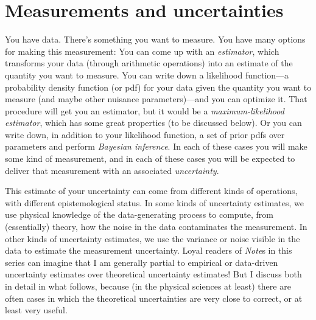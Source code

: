 \documentclass[10pt]{article}
\newcommand{\documentname}{\textsl{Note}}
\begin{document}
\section{Measurements and uncertainties}\label{sec:intro}

You have data. There's something you want to measure. You have many
options for making this measurement: You can come up with an
\textsl{estimator}, which transforms your data (through arithmetic
operations) into an estimate of the quantity you want to measure. You
can write down a likelihood function---a probability density function
(or pdf) for your data given the quantity you want to measure (and
maybe other nuisance parameters)---and you can optimize it. That
procedure will get you an estimator, but it would be a
\textsl{maximum-likelihood estimator}, which has some great
properties (to be discussed below).
Or you can write down, in addition to your likelihood
function, a set of prior pdfs over parameters and perform
\textsl{Bayesian inference}.  In each of these cases you will make
some kind of measurement, and in each of these cases you will be
expected to deliver that measurement with an associated \textsl{uncertainty}.

This estimate of your uncertainty can come from different kinds of operations, with
different epistemological status. In some kinds of uncertainty
estimates, we use physical knowledge of the data-generating process to
compute, from (essentially) theory, how the noise in the data
contaminates the measurement. In other kinds of uncertainty estimates,
we use the variance or noise visible in the data to estimate the measurement
uncertainty. Loyal readers of \documentname s in this series can imagine that
I am generally partial to empirical or data-driven uncertainty estimates over
theoretical uncertainty estimates! But I discuss both in detail in what follows,
because (in the physical sciences at least) there are often cases in which the
theoretical uncertainties are very close to correct, or at least very useful.
\end{document}

